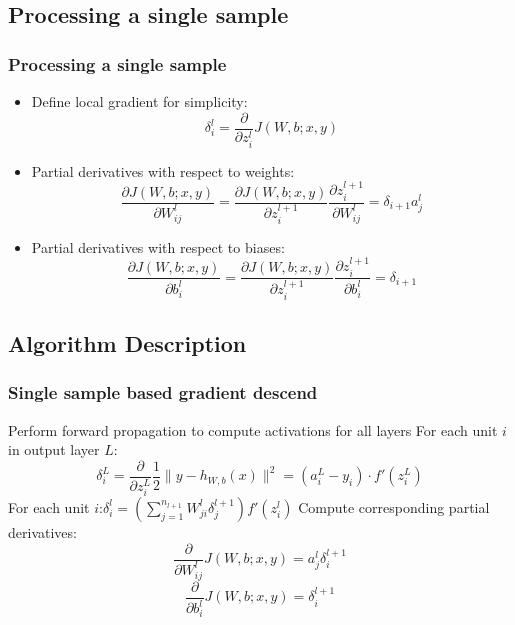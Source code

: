\documentclass{beamer}
\begin{document}
\begin{CJK*}{UTF8}{gbsn}
\subsection{Processing a single sample}
\begin{frame}\frametitle{Processing a single sample}
\begin{itemize}
\item Define local gradient for simplicity:
\begin{equation}
\delta_i^l=\frac{\partial}{\partial z_i^{l}}J(W,b;x,y)
\end{equation}
\item Partial derivatives with respect to weights:
\begin{equation}
\frac{\partial J(W,b;x,y)}{\partial W_{ij}^l}=\frac{\partial J(W,b;x,y)}{\partial z_i^{l+1}}\frac{\partial z_i^{l+1}}{\partial W_{ij}^l}=\delta_{i+1}a_j^l
\end{equation}
\item Partial derivatives with respect to biases:
\begin{equation}
\frac{\partial J(W,b;x,y)}{\partial b_{i}^l}=\frac{\partial J(W,b;x,y)}{\partial z_i^{l+1}}\frac{\partial z_i^{l+1}}{\partial b_{i}^l}=\delta_{i+1}
\end{equation}
\end{itemize}
\end{frame}

\subsection{Algorithm Description}
\begin{frame}\frametitle{Single sample based gradient descend}
\begin{algorithm}[H]
Perform forward propagation to compute activations for all layers\;
For each unit $i$ in output layer $L$:
\begin{equation}
\delta_i^{L}=\frac{\partial}{\partial z_i^{L}}\frac{1}{2}\|y-h_{W,b}(x)\|^2=(a_i^{L}-y_i)\cdot f'(z_i^{L})
\end{equation}
{
    For each unit $i$:$\delta_i^l=(\sum_{j=1}^{n_{l+1}}W_{ji}^l\delta_j^{l+1})f'(z_i^l)$\;
}
Compute corresponding partial derivatives:
\begin{equation}
\frac{\partial}{\partial W_{ij}^l}J(W,b;x,y)=a_j^l\delta_i^{l+1}
\end{equation}
\begin{equation}
\frac{\partial}{\partial b_{i}^l}J(W,b;x,y)=\delta_i^{l+1}
\end{equation}
\end{algorithm}
\end{frame}


\end{CJK*}
\end{document}
